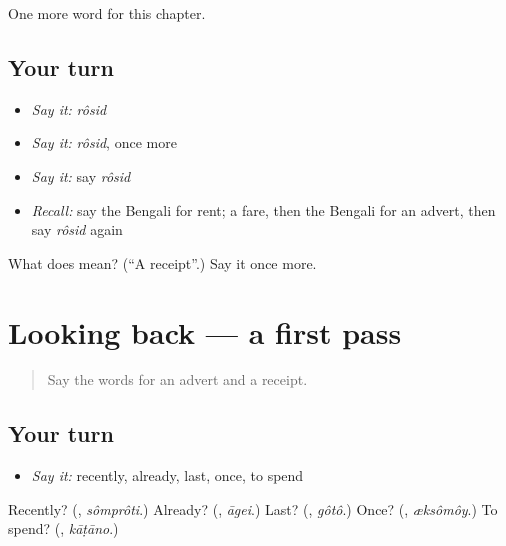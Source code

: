 \begin{grammarlens}[title={What you've built}]
One more word for this chapter.
\end{grammarlens}

\subsection*{Your turn}
\begin{itemize}
\raggedright
  \item \emph{Say it:} \emph{rôsid}
  \item \emph{Say it:} \emph{rôsid}, once more
  \item \emph{Say it:} say \emph{rôsid}
  \item \emph{Recall:} say the Bengali for rent; a fare, then the Bengali for an advert, then say \emph{rôsid} again
\end{itemize}

\begin{tcolorbox}[breakable,colback=teal!4,colframe=teal!35!black,title={Before you move on}]
What does  mean? (\textquotedblleft{}A receipt\textquotedblright{}.) Say it once more.
\end{tcolorbox}
\section[(dialogue)]{Looking back — a first pass}

\label{lesson:BN-R147-first-pass-looking-back}



\begin{quote}
Say the words for an advert and a receipt.
\end{quote}

\subsection*{Your turn}
\begin{itemize}
\raggedright
  \item \emph{Say it:} recently, already, last, once, to spend
\end{itemize}

\begin{tcolorbox}[breakable,colback=teal!4,colframe=teal!35!black,title={Before you move on}]
Recently? (\textbf{}, \emph{sômprôti}.) Already? (\textbf{}, \emph{āgei}.) Last? (\textbf{}, \emph{gôtô}.) Once? (\textbf{}, \emph{æksômôy}.) To spend? (\textbf{}, \emph{kāṭāno}.)
\end{tcolorbox}
